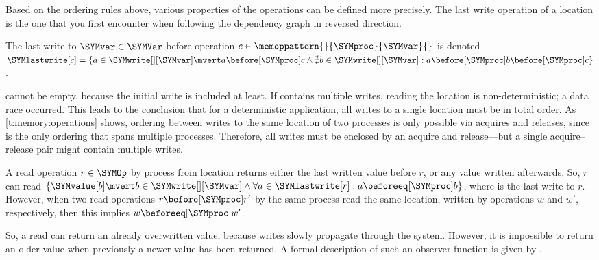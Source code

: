 Based on the ordering rules above, various properties of the operations can be defined more precisely.
The last write operation of a location is the one that you first encounter when following the dependency graph in reversed direction.
\begin{definition}
	The last write to $\SYMvar\in\SYMVar$ before operation $c\in\memoppattern{}{\SYMproc}{\SYMvar}{}$ is denoted
	$\SYMlastwrite[c]=\{a\in\SYMwrite[][\SYMvar] \mvert a\before[\SYMproc] c\wedge\nexists b\in\SYMwrite[][\SYMvar]:a\before[\SYMproc] b\before[\SYMproc] c\}$.
\end{definition}

\SYMlastwrite* cannot be empty, because the initial write is included at least.
If \SYMlastwrite contains multiple writes, reading the location is non-deterministic; a data race occurred.
This leads to the conclusion that for a deterministic application, all writes to a single location must be in total order.
As \vref{t:memory:operations} shows, ordering between writes to the same location of two processes is only possible via acquires and releases, since \SYMordersync is the only ordering that spans multiple processes.
Therefore, all writes must be enclosed by an acquire and release---but a single acquire--release pair might contain multiple writes.

\begin{definition}
	A read operation $r\in\SYMOp$ by process \SYMproc from location \SYMvar returns either the last written value before $r$, or any value written afterwards.
	So, $r$ can read \mbox{$\{\SYMvalue[b]\mvert b\in\SYMwrite[][\SYMvar] \wedge \forall a\in\SYMlastwrite[r]: a\beforeeq[\SYMproc] b\}$}, where \SYMlastwrite[r] is the last write to $r$.
	However, when two read operations $r\before[\SYMproc]r'$ by the same process read the same location, written by operations $w$ and $w'$, respectively, then this implies $w\beforeeq[\SYMproc] w'$.
\end{definition}
So, a read can return an already overwritten value, because writes slowly propagate through the system.
However, it is impossible to return an older value when previously a newer value has been returned.
A formal description of such an observer function is given by \citet{frigo:weakest_memory_model}.

